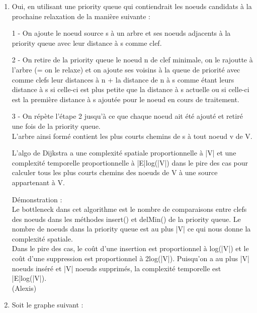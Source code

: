 \documentclass[11pt]{article}
\begin{document}
\begin{enumerate}
\item Oui, en utilisant une priority queue qui contiendrait les noeuds candidats à la prochaine
relaxation de la manière suivante :\\
\par 1 - On ajoute le noeud source s à un arbre et ses noeuds adjacents à la priority 
queue avec leur distance à s comme clef.\\
\par 2 - On retire de la priority queue le noeud n de clef minimale, on le rajoutte
 à l'arbre (= on le relaxe) et on ajoute ses voisins à la queue de priorité avec comme
 clefs leur distances à n + la distance de n à s comme étant leurs distance à s si 
 celle-ci est plus petite que la distance à s actuelle ou si celle-ci est la première
 distance à s ajoutée pour le noeud en cours de traitement.\\
\par 3 - On répète l'étape 2 jusqu'à ce que chaque noeud ait été ajouté et retiré une fois
 de la priority queue.\\
L'arbre ainsi formé contient les plus courts chemins de s à tout noeud v de V.\\
\par L'algo de Dijkstra a une complexité spatiale proportionnelle à |V| et une complexité
 temporelle proportionnelle à |E|log(|V|) dans le pire des cas pour calculer tous les 
 plus courts chemins des noeuds de V à une source appartenant à V.
\par Démonstration :\\
Le bottleneck dans cet algorithme est le nombre de comparaisons entre clefs des noeuds
 dans les méthodes insert() et delMin() de la priority queue. Le nombre de noeuds dans 
 la priority queue est au plus |V| ce qui nous donne la complexité spatiale.\\
 Dans le pire des cas, le coût d'une insertion est proportionnel à log(|V|) et le coût
 d'une suppression est proportionnel à 2log(|V|). Puisqu'on a au plus |V| noeuds inséré
 et |V| noeuds supprimés, la complexité temporelle est |E|log(|V|).\\

(Alexis)\\

\item Soit le graphe suivant :\\


\end{enumerate}
\end{document}

